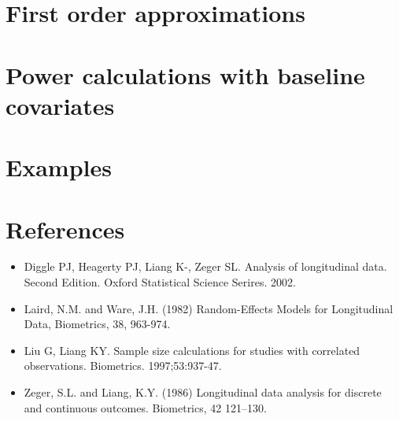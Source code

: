 \documentclass[12pt]{article}
\begin{document}

\section{First order approximations}
\section{Power calculations with baseline covariates}
\section{Examples}
\section{References}
\begin{itemize}
\item Diggle PJ, Heagerty PJ, Liang K-, Zeger SL. Analysis of longitudinal data. Second Edition. Oxford Statistical Science Serires. 2002.
\item Laird, N.M. and Ware, J.H. (1982) Random-Effects Models for Longitudinal Data, Biometrics, 38, 963-974.
\item Liu G, Liang KY. Sample size calculations for studies with correlated observations. Biometrics. 1997;53:937-47.
\item Zeger, S.L. and Liang, K.Y. (1986) Longitudinal data analysis for discrete and continuous outcomes. Biometrics, 42 121--130.
\end{itemize}
\end{document}
